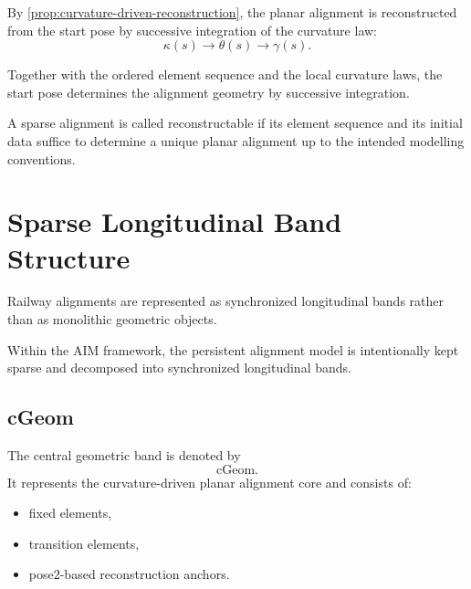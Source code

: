 \begin{corollary}
\label{cor:sparse-reconstruction-chain}
By \cref{prop:curvature-driven-reconstruction}, the planar alignment is
reconstructed from the start pose by successive integration of the
curvature law:
\[
\kappa(s)
\rightarrow
\theta(s)
\rightarrow
\gamma(s).
\]
\end{corollary}

Together with the ordered element sequence and the local curvature laws,
the start pose determines the alignment geometry by successive
integration.

\begin{definition}
A sparse alignment is called reconstructable if its element sequence and
its initial data suffice to determine a unique planar alignment up to
the intended modelling conventions.
\end{definition}

\section{Sparse Longitudinal Band Structure}

\begin{principle}
Railway alignments are represented as synchronized longitudinal bands
rather than as monolithic geometric objects.
\end{principle}

Within the AIM framework, the persistent alignment model is intentionally
kept sparse and decomposed into synchronized longitudinal bands.

\subsection{cGeom}

\begin{definition}
The central geometric band is denoted by
\[
\mathrm{cGeom}.
\]
It represents the curvature-driven planar alignment core and consists of:
\begin{itemize}
\item fixed elements,
\item transition elements,
\item pose2-based reconstruction anchors.
\end{itemize}
\end{definition}

